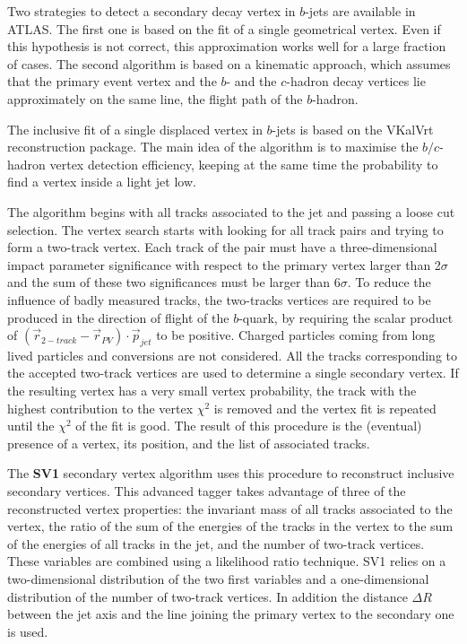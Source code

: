Two strategies to detect a secondary decay vertex in $b$-jets are available in ATLAS. The first one is based on the fit of a single geometrical vertex. Even if this hypothesis is not correct, this approximation works well for a large fraction of cases.  The second algorithm is based on a kinematic approach, which assumes that the primary event vertex and the $b$- and the $c$-hadron decay vertices lie approximately on the same line, the flight path of the $b$-hadron. 

The inclusive fit of a single displaced vertex in $b$-jets is based on the VKalVrt~\cite{Kostyukhin:685551} reconstruction package. The main idea of the algorithm %
is to maximise the $b/c$-hadron vertex detection efficiency, keeping at the same time the probability to find a vertex inside a light jet low. 

The algorithm begins with all tracks associated to the jet and passing a loose cut selection. The vertex search starts with looking for all track pairs and trying to form a two-track vertex. Each track of the pair must have a three-dimensional impact parameter significance with respect to the primary vertex larger than 2$\sigma$ and the sum of these two significances must be larger than 6$\sigma$. To reduce the influence of badly measured tracks, the two-tracks vertices are required to be produced in the direction of flight of the $b$-quark, by requiring the scalar product of $(\vec{r}_{2-track} - \vec{r}_{PV})\cdot \vec{p}_{jet} $ to be positive. Charged particles coming from long lived particles and conversions are not considered.  %
All the tracks corresponding to the accepted two-track vertices are used to determine a single secondary vertex.  If the resulting vertex has a very small vertex probability, the track with the highest contribution to the vertex $\chi^2$  is removed and the vertex fit is repeated until the $\chi^2$ of the fit is good. The result of this procedure is the (eventual) presence of a vertex, its position, and the list of associated tracks.

The \textbf{SV1} secondary vertex algorithm uses this procedure to reconstruct inclusive secondary vertices. This advanced tagger takes advantage of three of the reconstructed vertex properties: the invariant mass of all tracks associated to the vertex, the ratio of the sum of the energies of the tracks in the vertex to the sum of the energies of all tracks in the jet, and the number of two-track vertices. These variables are combined using a likelihood ratio technique. SV1 relies on a two-dimensional distribution of the two first variables and a one-dimensional distribution of the number of two-track vertices. In addition the distance $\Delta R$ between the jet axis and the line joining the primary vertex to the secondary one is used. 

